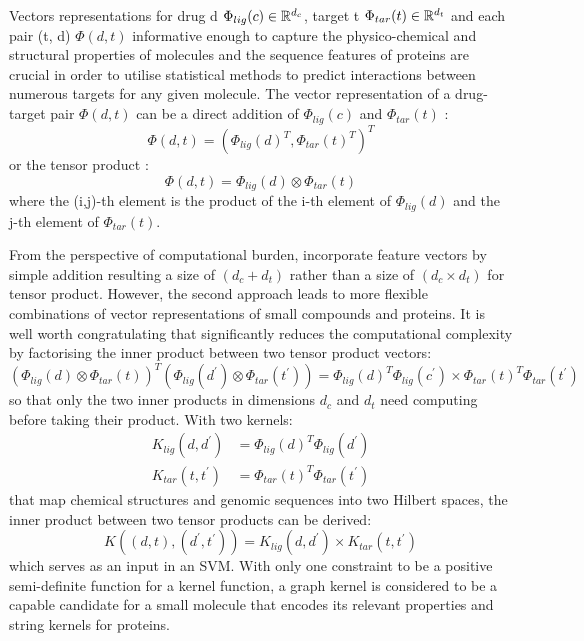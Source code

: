 \documentclass[a4paper,12pt]{report}
\begin{document}
Vectors representations for drug d $\Phi_{lig}(c) \in \Bbb{R}^{d_c}$, target t $\Phi_{tar}(t) \in \Bbb{R}^{d_t}$ and each pair (t, d) $\Phi(d,t)$ informative enough to capture the physico-chemical and structural properties of molecules and the sequence features of proteins are crucial in order to utilise statistical methods to predict interactions between numerous targets for any given molecule. The vector representation of a drug-target pair $\Phi(d,t)$ can be a direct addition of $\Phi_{lig}(c)$ and $\Phi_{tar}(t)$ \citep{erh06}:
\begin{equation}
\Phi(d,t) = (\Phi_{lig}(d)^T, \Phi_{tar}(t)^T)^T
\end{equation}
or the tensor product \citep{fau08}:
\begin{equation}
\Phi(d,t) = \Phi_{lig}(d) \otimes \Phi_{tar}(t)
\end{equation}
where the (i,j)-th element is the product of the i-th element of $\Phi_{lig}(d)$ and the j-th element of $\Phi_{tar}(t)$.

From the perspective of computational burden, \citet{erh06} incorporate feature vectors by simple addition resulting a size of $(d_c + d_t)$ rather than a size of $(d_c \times d_t)$ for tensor product. However, the second approach leads to more flexible combinations of vector representations of small compounds and proteins. It is well worth congratulating that \citet{jac08} significantly reduces the computational complexity by factorising the inner product between two tensor product vectors:
\begin{equation}
(\Phi_{lig}(d) \otimes \Phi_{tar}(t))^T(\Phi_{lig}(d^{'}) \otimes \Phi_{tar}(t^{'})) = \Phi_{lig}(d)^T\Phi_{lig}(c^{'})\times\Phi_{tar}(t)^T\Phi_{tar}(t^{'})
\end{equation}
so that only the two inner products in dimensions $d_c$ and $d_t$ need computing before taking their product. With two kernels:
\begin{eqnarray}
K_{lig}(d, d^{'}) &= \Phi_{lig}(d)^T\Phi_{lig}(d^{'})\\
K_{tar}(t, t^{'}) &= \Phi_{tar}(t)^T\Phi_{tar}(t^{'})
\end{eqnarray}
that map chemical structures and genomic sequences into two Hilbert spaces, the inner product between two tensor products can be derived:
\begin{equation}
K((d,t),(d^{'},t^{'})) = K_{lig}(d,d^{'})\times K_{tar}(t,t^{'})
\end{equation}
which serves as an input in an SVM. With only one constraint to be a positive semi-definite function for a kernel function, a graph kernel is considered to be a capable candidate for a small molecule that encodes its relevant properties and string kernels for proteins.
\end{document}
